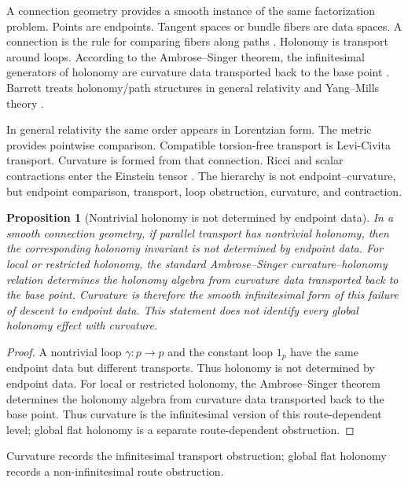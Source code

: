 \documentclass[12pt]{article}
\newtheorem{proposition}[proposition]{Proposition}
\newcommand{\citep}[1]{\cite{#1}}
\begin{document}
A connection geometry provides a smooth instance of the same factorization
problem. Points are endpoints. Tangent spaces or bundle fibers are data
spaces. A connection is the rule for comparing fibers along paths
\citep{Ehresmann1950,KobayashiNomizu1963,Nakahara2003}. Holonomy is
transport around loops. According to the Ambrose--Singer theorem, the
infinitesimal generators of holonomy are curvature data transported back
to the base point \citep{AmbroseSinger1953,KobayashiNomizu1963}.
Barrett treats holonomy/path structures in general relativity and
Yang--Mills theory \citep{Barrett1991}.

In general relativity the same order appears in Lorentzian form. The
metric provides pointwise comparison. Compatible torsion-free transport is
Levi-Civita transport. Curvature is formed from that connection. Ricci
and scalar contractions enter the Einstein tensor
\citep{Einstein1916,Wald1984,Malament2012,Carroll2019}. The hierarchy is
not endpoint--curvature, but endpoint comparison, transport, loop
obstruction, curvature, and contraction.

\begin{proposition}[Nontrivial holonomy is not determined by endpoint data]
\label{prop:curvature-realization}
In a smooth connection geometry, if parallel transport has nontrivial
holonomy, then the corresponding holonomy invariant is not determined by
endpoint data. For local or restricted holonomy, the standard
Ambrose--Singer curvature--holonomy relation determines the holonomy algebra
from curvature data transported back to the base point. Curvature is
therefore the smooth infinitesimal form of this failure of descent to
endpoint data.
This statement does not identify every global holonomy effect with
curvature.
\end{proposition}

\begin{proof}
A nontrivial loop $\gamma:p\to p$ and the constant loop $1_p$ have the
same endpoint data but different transports. Thus holonomy is not
determined by endpoint data. For local or restricted holonomy, the
Ambrose--Singer theorem determines the holonomy algebra from curvature data
transported back to the base point.
Thus curvature is the infinitesimal version of this route-dependent
level; global flat holonomy is a separate route-dependent obstruction.
\end{proof}

Curvature records the infinitesimal transport obstruction; global flat
holonomy records a non-infinitesimal route obstruction.
\end{document}
